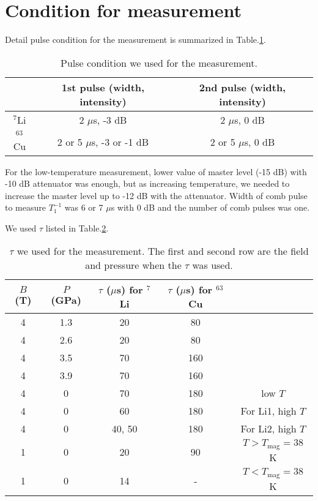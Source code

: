 \section{Condition for measurement}
Detail pulse condition for the measurement is summarized in Table.\ref{pulse}.
\begin{table}
\begin{center}
\caption{Pulse condition we used for the measurement.}
\begin{tabular}{ccc} \hline
            & 1st pulse (width, intensity)& 2nd pulse (width, intensity)\\ \hline
 ${}^7$Li   & 2 $\mu$s, -3 dB         & 2 $\mu$s, 0 dB\\ \hline
 ${}^{63}$Cu& 2 or 5 $\mu$s, -3 or -1 dB      & 2 or 5 $\mu$s, 0 dB\\ \hline
\end{tabular}
\label{pulse}
\end{center}
\end{table}
For the low-temperature measurement, lower value of master level (-15 dB) with -10 dB attenuator was enough, but as increasing temperature, we needed to increase the master level
up to -12 dB with the attenuator.
Width of comb pulse to measure $T^{-1}_1$ was 6 or 7 $\mu$s with 0 dB and the number of comb pulses was one.

We used $\tau$ listed in Table.\ref{tau}.
\begin{table}
\begin{center}
\caption{$\tau$ we used for the measurement. The first and second row are the field and pressure when the $\tau$ was used.}
\begin{tabular}{ccccc} \hline
 $B$ (T)& $P$ (GPa)& $\tau$ ($\mu$s) for ${}^7$Li& $\tau$ ($\mu$s) for ${}^{63}$Cu\\ \hline
 4& 1.3& 20& 80&\\ \hline
 4& 2.6& 20& 80&\\ \hline
 4& 3.5& 70& 160&\\ \hline
 4& 3.9& 70& 160&\\ \hline
 4& 0& 70& 180&low $T$\\ \hline
 4& 0& 60& 180&For Li1, high $T$\\ \hline
 4& 0& 40, 50& 180&For Li2, high $T$\\ \hline
 1& 0& 20& 90&$T > T_{\mathrm{mag}} = 38$ K\\ \hline
 1& 0& 14& -&$T < T_{\mathrm{mag}} = 38$ K\\ \hline
\end{tabular}
\label{tau}
\end{center}
\end{table}

